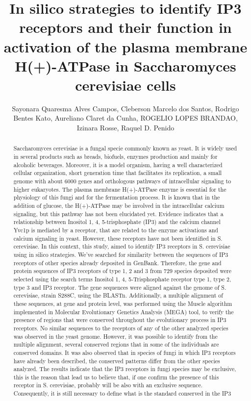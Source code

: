 \documentclass[twoside]{article}
\title{\vspace{-15mm}\fontsize{24pt}{10pt}\selectfont\textbf{ In silico strategies to identify IP3 receptors and their function in activation of the plasma membrane H(+)-ATPase in Saccharomyces cerevisiae cells }} %
\author{ Sayonara Quaresma Alves Campos,  Cleberson Marcelo dos Santos,  Rodrigo Bentes Kato,  Aureliano Claret da Cunha,  ROGELIO LOPES BRANDAO,  Izinara Rosse,  Raquel D. Penido }
\affil{ UNIVERSIDADE FEDERAL DE MINAS GERAIS,  UNIVERSIDADE FEDERAL DE OURO PRETO,  UFOP- UNIVERSIDADE FEDERAL DE OURO PRETO,  UFOP }
\date{}
\begin{document}
  
  
  \maketitle %
  
  
  \thispagestyle{fancy} %
  
  
  \begin{abstract}
  Saccharomyces cerevisiae is a fungal specie commonly known as yeast. It is widely used in several products such as breads,  biofuels,  enzymes production and mainly for alcoholic beverages. Moreover,  it is a model organism,  having a well characterized cellular organization,  short generation time that facilitates its replication,  a small genome with about 6000 genes and orthologous pathways of intracellular signaling to higher eukaryotes. The plasma membrane H(+)-ATPase enzyme is essential for the physiology of this fungi and for the fermentation process. It is known that in the addition of glucose,  the H(+)-ATPase may be involved in the intracellular calcium signaling,  but this pathway has not been elucidated yet. Evidence indicates that a relationship between Inositol 1, 4, 5-trisphosphate (IP3) and the calcium channel Yvc1p is mediated by a receptor,  that are related to the enzyme activations and calcium signaling in yeast. However,  these receptors have not been identified in S. cerevisiae. In this context,  this study,  aimed to identify IP3 receptors in S. cerevisiae using in silico strategies. We’ve searched for similarity between the sequences of IP3 receptors of other species already deposited in GenBank. Therefore,  the gene and protein sequences of IP3 receptors of type 1,  2 and 3 from 729 species deposited were selected using the search terms Inositol 1, 4, 5-Trisphosphate receptor type 1,  type 2,  type 3 and IP3 receptor. The gene sequences were aligned against the genome of S. cerevisiae,  strain S288C,  using the BLASTn. Additionally,  a multiple alignment of these sequences,  at gene and protein level,  was performed using the Muscle algorithm implemented in Molecular Evolutionary Genetics Analysis (MEGA) tool,  to verify the presence of regions that were conserved throughout the evolutionary process in IP3 receptors. No similar sequences to the receptors of any of the other analyzed species was observed in the yeast genome. However,  it was possible to identify from the multiple alignment,  several conserved regions that in some of the individuals are conserved domains. It was also observed that in species of fungi in which IP3 receptors have already been described,  the conserved patterns differ from the other species analyzed. The results indicate that the IP3 receptors in fungi species may be exclusive,  this is the reason that lead us to believe that,  if one confirm the presence of this receptor in S. cerevisiae,  probably will be also with an exclusive sequence. Consequently,  it is still necessary to define what is the standard conserved in the IP3 
\end{abstract}
\end{document}
